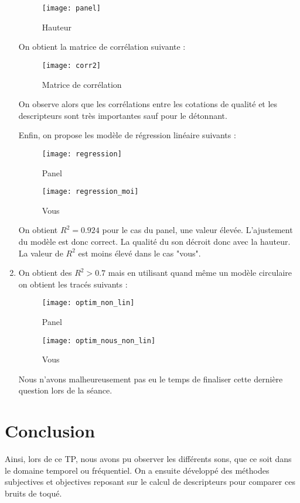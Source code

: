 \documentclass[12pt,a4paper,titlepage]{article}
\begin{document}
\begin{enumerate}
{    \begin{figure}[H]
        \caption{Hauteur}
        \texttt{[image: panel]}
        \centering
    \end{figure}

    On obtient la matrice de corrélation suivante :

    \begin{figure}[H]
        \caption{Matrice de corrélation}
        \texttt{[image: corr2]}
        \centering
    \end{figure}

    On observe alors que les corrélations entre les cotations de qualité et les descripteurs sont très importantes sauf pour le détonnant.

    Enfin, on propose les modèle de régression linéaire suivants :

    \begin{figure}[H]
        \caption{Panel}
        \texttt{[image: regression]}
        \centering
    \end{figure}

    \begin{figure}[H]
        \caption{Vous}
        \texttt{[image: regression\_moi]}
        \centering
    \end{figure}

    On obtient $R^2 = 0.924$ pour le cas du panel, une valeur élevée. L'ajustement du modèle est donc correct. La qualité du son décroit donc avec la hauteur.
    La valeur de $R^2$ est moins élevé dans le cas "vous".}

    \item{On obtient des $R^2 > 0.7$ mais en utilisant quand même un modèle circulaire on obtient les tracés suivants :

    \begin{figure}[H]
        \caption{Panel}
        \texttt{[image: optim\_non\_lin]}
        \centering
    \end{figure}

    \begin{figure}[H]
        \caption{Vous}
        \texttt{[image: optim\_nous\_non\_lin]}
        \centering
    \end{figure}

    Nous n'avons malheureusement pas eu le temps de finaliser cette dernière question lors de la séance.
        }
\end{enumerate}

\section*{Conclusion}

Ainsi, lors de ce TP, nous avons pu observer les différents sons, que ce soit dans le domaine temporel ou fréquentiel. On a ensuite
développé des méthodes subjectives et objectives reposant sur le calcul de descripteurs pour comparer ces bruits de toqué.
\end{document}
